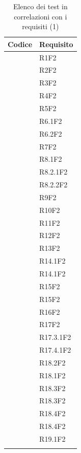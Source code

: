 	\begin{table}[H]
		\centering
		{\def\arraystretch{1.4}
		\begin{tabularx}{\textwidth}{YY}
			\textbf{Codice} & \textbf{Requisito} \\
			\toprule
			\addtotv & R1F2 \\
			\addtotv & R2F2 \\
			\addtotv & R3F2 \\
			\addtotv & R4F2 \\
			\addtotv & R5F2 \\
			\addtotv & R6.1F2 \\
			\addtotv & R6.2F2 \\
			\addtotv & R7F2 \\
			\addtotv & R8.1F2 \\
			\addtotv & R8.2.1F2 \\
			\addtotv & R8.2.2F2 \\
			\addtotv & R9F2 \\
			\addtotv & R10F2 \\
			\addtotv & R11F2 \\
			\addtotv & R12F2 \\
			\addtotv & R13F2 \\
			\addtotv & R14.1F2 \\			
			\addtotv & R14.1F2 \\
			\addtotv & R15F2 \\
			\addtotv & R15F2 \\
			\addtotv & R16F2 \\
			\addtotv & R17F2 \\
			\addtotv & R17.3.1F2 \\
			\addtotv & R17.4.1F2 \\
			\addtotv & R18.2F2 \\
			\addtotv & R18.1F2 \\
			\addtotv & R18.3F2 \\
			\addtotv & R18.3F2 \\
			\addtotv & R18.4F2 \\
			\addtotv & R18.4F2 \\
			\addtotv & R19.1F2 \\
            \bottomrule\\
            \end{tabularx}}
		\caption{Elenco dei test in correlazioni con i requisiti (1)}
	\end{table}
